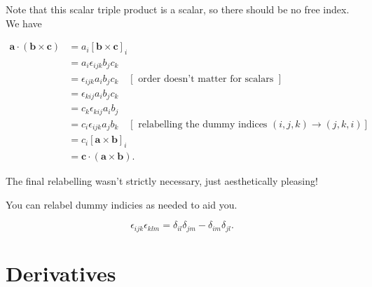 \begin{example}
  Note that this scalar triple product is a scalar, so there should be no free index.
We have

\[
\begin{aligned}
\boldsymbol{a} \cdot(\boldsymbol{b} \times \boldsymbol{c}) & =a_i[\boldsymbol{b} \times \boldsymbol{c}]_i \\
& =a_i \epsilon_{i j k} b_j c_k \\
& =\epsilon_{i j k} a_i b_j c_k \quad[\text { order doesn't matter for scalars }] \\
& =\epsilon_{k i j} a_i b_j c_k \\
& =c_k \epsilon_{k i j} a_i b_j \\
& =c_i \epsilon_{i j k} a_j b_k \quad[\text { relabelling the dummy indices }(i, j, k) \rightarrow(j, k, i)] \\
& =c_i[\boldsymbol{a} \times \boldsymbol{b}]_i \\
& =\boldsymbol{c} \cdot(\boldsymbol{a} \times \boldsymbol{b}) .
\end{aligned}
\]

The final relabelling wasn't strictly necessary, just aesthetically pleasing!
\end{example}

\begin{remark}
  You can relabel dummy indicies as needed to aid you.
\end{remark}

\begin{proposition}
  \[
\epsilon_{i j k} \epsilon_{k l m}=\delta_{i l} \delta_{j m}-\delta_{i m} \delta_{j l} .
\]
\end{proposition}

\begin{proofidea}
  
  
\end{proofidea}
  
\begin{formalproof}
  
\end{formalproof}

\section{Derivatives}

